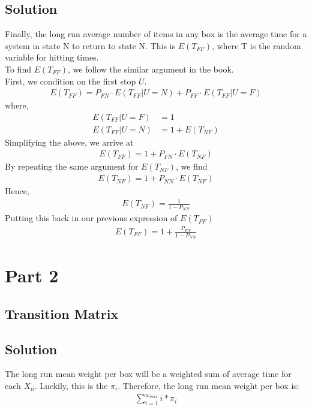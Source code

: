 \documentclass[10pt,a4paper]{article}
\begin{document}
\subsection*{Solution}
Finally, the long run average number of items in any box is the average time for a system in state N to return to state N. This is $ E(T_{FF}) $, where T is the random variable for hitting times. \\
To find $ E(T_{FF}) $, we follow the similar argument in the book. \\
First, we condition on the first stop $ U $. 
\begin{align*}
E(T_{FF}) = P_{FN}\cdot E(T_{FF}|U=N)+P_{FF}\cdot E(T_{FF}|U=F)
\end{align*}
where,\\
\begin{align*}
E(T_{FF}|U=F) &= 1 \\
E(T_{FF}|U=N) &= 1+E(T_{NF})
\end{align*}
Simplifying the above, we arrive at\\
\begin{align*}
E(T_{FF}) = 1+ P_{FN}\cdot E(T_{NF})
\end{align*}
By repeating the same argument for $ E(T_{NF}) $, we find \\
\begin{align*}
E(T_{NF}) = 1+ P_{NN}\cdot E(T_{NF})
\end{align*}
Hence, 
\begin{align*}
E(T_{NF}) = \frac{1}{1 - P_{NN}}
\end{align*}
Putting this back in our previous expression of $ E(T_{FF}) $
\begin{align*}
E(T_{FF}) = 1+ \frac{P_{FN}}{1 - P_{NN}}
\end{align*}


\section{Part 2}
\subsection{Transition Matrix}


\subsection{Solution}
The long run mean weight per box will be a weighted sum of average time for each $X_n$. Luckily, this is the $\pi_i$. Therefore, the long run mean weight per box is:
\begin{align*}
\sum_{i=1}^{w_{max}} i*\pi_i
\end{align*}
\end{document}
